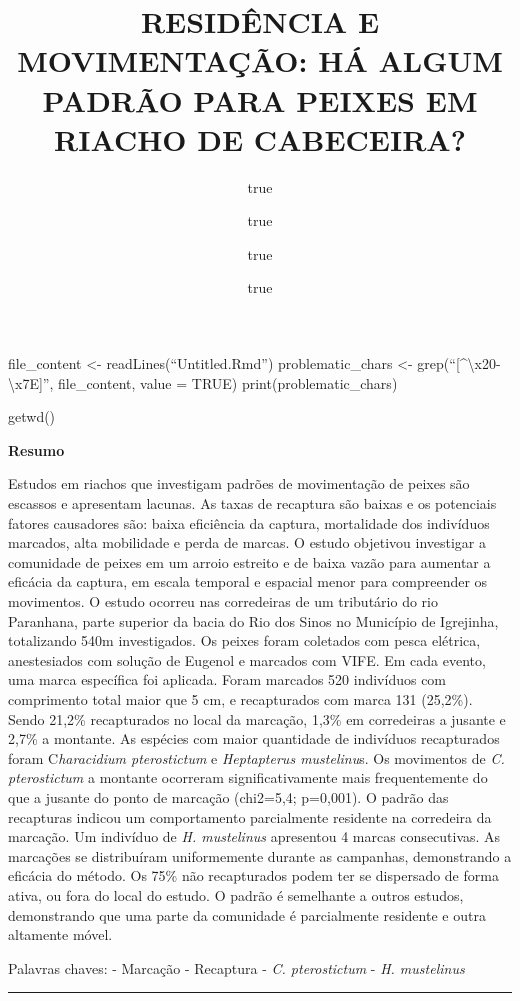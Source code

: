 \documentclass[
]{article}
\title{RESIDÊNCIA E MOVIMENTAÇÃO: HÁ ALGUM PADRÃO PARA PEIXES EM RIACHO
DE CABECEIRA?}
\author{true \and true \and true \and true}
\date{}
\begin{document}
\maketitle

file\_content \textless- readLines(``Untitled.Rmd'') problematic\_chars
\textless- grep(``{[}\^{}\textbackslash x20-\textbackslash x7E{]}'',
file\_content, value = TRUE) print(problematic\_chars)

getwd()

\textbf{Resumo}

Estudos em riachos que investigam padrões de movimentação de peixes são
escassos e apresentam lacunas. As taxas de recaptura são baixas e os
potenciais fatores causadores são: baixa eficiência da captura,
mortalidade dos indivíduos marcados, alta mobilidade e perda de marcas.
O estudo objetivou investigar a comunidade de peixes em um arroio
estreito e de baixa vazão para aumentar a eficácia da captura, em escala
temporal e espacial menor para compreender os movimentos. O estudo
ocorreu nas corredeiras de um tributário do rio Paranhana, parte
superior da bacia do Rio dos Sinos no Município de Igrejinha,
totalizando 540m investigados. Os peixes foram coletados com pesca
elétrica, anestesiados com solução de Eugenol e marcados com VIFE. Em
cada evento, uma marca específica foi aplicada. Foram marcados 520
indivíduos com comprimento total maior que 5 cm, e recapturados com
marca 131 (25,2\%). Sendo 21,2\% recapturados no local da marcação,
1,3\% em corredeiras a jusante e 2,7\% a montante. As espécies com maior
quantidade de indivíduos recapturados foram C\emph{haracidium
pterostictum} e \emph{Heptapterus mustelinu}s. Os movimentos de \emph{C.
pterostictum} a montante ocorreram significativamente mais
frequentemente do que a jusante do ponto de marcação (chi2=5,4;
p=0,001). O padrão das recapturas indicou um comportamento parcialmente
residente na corredeira da marcação. Um indivíduo de \emph{H.
mustelinus} apresentou 4 marcas consecutivas. As marcações se
distribuíram uniformemente durante as campanhas, demonstrando a eficácia
do método. Os 75\% não recapturados podem ter se dispersado de forma
ativa, ou fora do local do estudo. O padrão é semelhante a outros
estudos, demonstrando que uma parte da comunidade é parcialmente
residente e outra altamente móvel.

Palavras chaves: - Marcação - Recaptura - \emph{C. pterostictum} -
\emph{H. mustelinus}

\begin{center}\rule{0.5\linewidth}{0.5pt}\end{center}
\end{document}
